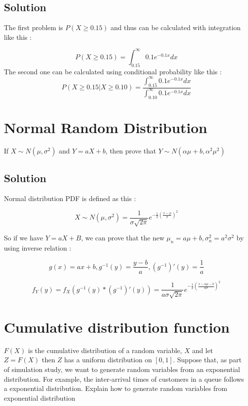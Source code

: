 \documentclass[12pt,a4paper]{article}
\begin{document}
\subsection{Solution}

The first problem is $P(X \geq 0.15)$ and thus can be calculated with integration like this :

\[
    P(X \geq 0.15) = \int_{0.15}^\infty 0.1e^{-0.1x} dx
\]
The second one can be calculated using conditional probability like this :
\[
    P(X \geq 0.15 | X \geq 0.10) = \frac{\int_{0.15}^\infty 0.1e^{-0.1x} dx}{\int_{0.10}^\infty 0.1e^{-0.1x} dx}
\]
\section{Normal Random Distribution}

If $X\sim N(\mu, \sigma^2)$ and $Y=aX+b$, then prove that $Y\sim N(\alpha\mu + b, \alpha^2\mu^2)$

\subsection{Solution}

Normal distribution PDF is defined as this :

\[
    X\sim N(\mu, \sigma^2) = \frac{1}{\sigma\sqrt{2\pi}} e^{-\frac{1}{2}(\frac{x-\mu}{\sigma})^2}
\]


So if we have $Y=aX+B$, we can prove that the new $\mu_n = a\mu + b, \sigma_n^2 = a^2\sigma^2$ by using inverse relation :

\[
    g(x) = ax + b, g^{-1}(y) = \frac{y-b}{a}, (g^{-1})'(y) = \frac{1}{a}
\]

\[
    f_Y(y) = f_X(g^{-1}(y) * (g^{-1})'(y)) = \frac{1}{a \sigma\sqrt{2\pi}} e^{-\frac{1}{2}(\frac{x-a\mu-b}{a\sigma})^2}

\]

\section{Cumulative distribution function}

$F(X)$ is the cumulative distribution of a random variable, $X$ and let $Z=F(X)$ then $Z$ has a uniform distribution on $[0,1]$. Suppose that, as part of simulation study, we want to generate random variables from an exponential distribution. For example, the inter-arrival times of customers in a queue follows a exponential distribution. Explain how to generate random variables from exponential distribution
\end{document}
